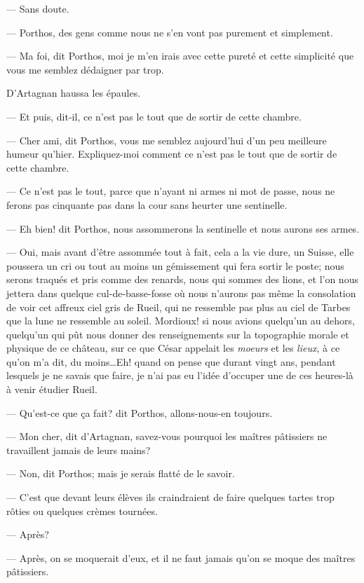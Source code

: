 — Sans doute.

— Porthos, des gens comme nous ne s'en vont pas purement et simplement.

— Ma foi, dit Porthos, moi je m'en irais avec cette pureté et cette simplicité que vous me semblez dédaigner par trop.

D'Artagnan haussa les épaules.

— Et puis, dit-il, ce n'est pas le tout que de sortir de cette chambre.

— Cher ami, dit Porthos, vous me semblez aujourd'hui d'un peu meilleure humeur qu'hier. Expliquez-moi comment ce n'est pas le tout que de sortir de cette chambre.

— Ce n'est pas le tout, parce que n'ayant ni armes ni mot de passe, nous ne ferons pas cinquante pas dans la cour sans heurter une sentinelle.

— Eh bien! dit Porthos, nous assommerons la sentinelle et nous aurons ses armes.

— Oui, mais avant d'être assommée tout à fait, cela a la vie dure, un Suisse, elle poussera un cri ou tout au moins un gémissement qui fera sortir le poste; nous serons traqués et pris comme des renards, nous qui sommes des lions, et l'on nous jettera dans quelque cul-de-basse-fosse où nous n'aurons pas même la consolation de voir cet affreux ciel gris de Rueil, qui ne ressemble pas plus au ciel de Tarbes que la lune ne ressemble au soleil. Mordioux! si nous avions quelqu'un au dehors, quelqu'un qui pût nous donner des renseignements sur la topographie morale et physique de ce château, sur ce que César appelait les \textit{moeurs} et les \textit{lieux}, à ce qu'on m'a dit, du moins\dots Eh! quand on pense que durant vingt ans, pendant lesquels je ne savais que faire, je n'ai pas eu l'idée d'occuper une de ces heures-là à venir étudier Rueil.

— Qu'est-ce que ça fait? dit Porthos, allons-nous-en toujours.

— Mon cher, dit d'Artagnan, savez-vous pourquoi les maîtres pâtissiers ne travaillent jamais de leurs mains?

— Non, dit Porthos; mais je serais flatté de le savoir.

— C'est que devant leurs élèves ils craindraient de faire quelques tartes trop rôties ou quelques crèmes tournées.

— Après?

— Après, on se moquerait d'eux, et il ne faut jamais qu'on se moque des maîtres pâtissiers.


